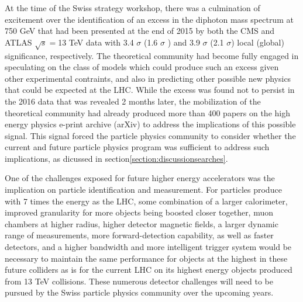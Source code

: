 At the time of the Swiss strategy workshop, there was a culmination of excitement over the identification of an excess in the diphoton mass spectrum at 750 GeV that had been presented at the end of 2015 by both the CMS and ATLAS $\sqrt{s}=$13 TeV data with 3.4 $\sigma$ (1.6 $\sigma$ ) and 3.9 $\sigma$ (2.1 $\sigma$) local (global) significance, respectively.  The theoretical community had become fully engaged in speculating on the class of models which could produce such an excess given other experimental contraints, and also in predicting other possible new physics that could be expected at the LHC.   While the excess was found not to persist in the 2016 data that was revealed 2 months later, the mobilization of the theoretical community had already produced more than 400 papers on the high energy physics e-print archive (arXiv) to address the implications of this possible signal. 
This signal forced the particle physics community to consider whether the current and future particle physics program was sufficient to address such implications, as dicussed in section\ref{section:discussionsearches}. 

One of the challenges exposed for future higher energy accelerators was the implication on particle identification and measurement. For particles produce with 7 times the energy as the LHC, some combination of a larger calorimeter, improved granularity for more objects being boosted closer together, muon chambers at higher radius, higher detector magnetic fields, a larger dynamic range of measurements, more forward-detection capability, as well as faster detectors, and a higher bandwidth and more intelligent trigger system would be necessary to maintain the same performance for objects at the highest in these future colliders as is for the current LHC on its highest energy objects produced from 13 TeV collisions.   These numerous detector challenges will need to be pursued by the Swiss particle physics community over the upcoming years. 

